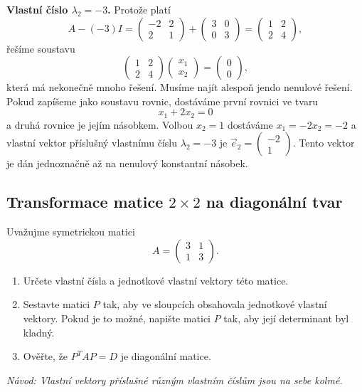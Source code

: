 \textbf{Vlastní číslo $\lambda_2=-3$.}
Protože platí $$A-(-3) I=
\begin{pmatrix}
  -2 & 2\\2&1
\end{pmatrix}
+
\begin{pmatrix}
  3&0\\0&3
\end{pmatrix}=
\begin{pmatrix}
  1 & 2\\ 2 &4
\end{pmatrix},
$$
řešíme soustavu 
$$
\begin{pmatrix}
1 & 2\\ 2 &4
\end{pmatrix}
\begin{pmatrix}
  x_1\\x_2
\end{pmatrix}
=
\begin{pmatrix}
  0\\0
\end{pmatrix},
$$
která má nekonečně mnoho řešení. Musíme najít alespoň jendo nenulové řešení. Pokud zapíšeme jako soustavu rovnic, dostáváme první rovnici ve tvaru
$$x_1+2x_2=0$$ a druhá rovnice je jejím násobkem. Volbou $x_2=1$ dostáváme $x_1=-2x_2=-2$ a vlastní vektor příslušný vlastnímu číslu $\lambda_2=-3$ je $\vec e_2=
\begin{pmatrix}
  -2\\1
\end{pmatrix}.
$ Tento vektor je dán jednoznačně až na nenulový konstantní násobek.

\konec


\subsection{Transformace matice $2\times 2$ na diagonální tvar}

Uvažujme symetrickou matici
\begin{equation*} A=
  \begin{pmatrix}
  3 & 1\\
  1 & 3
\end{pmatrix}.
\end{equation*}
\begin{enumerate}
\item Určete vlastní čísla a jednotkové vlastní vektory této matice.
\item Sestavte matici $P$ tak, aby ve sloupcích obsahovala jednotkové vlastní vektory.
Pokud je to možné, napište matici $P$ tak, aby její determinant byl kladný.
\item Ověřte, že  $P^TAP=D$  je diagonální matice.
\end{enumerate}
\textit{Návod: Vlastní vektory příslušné různým vlastním číslům jsou na sebe kolmé.}

